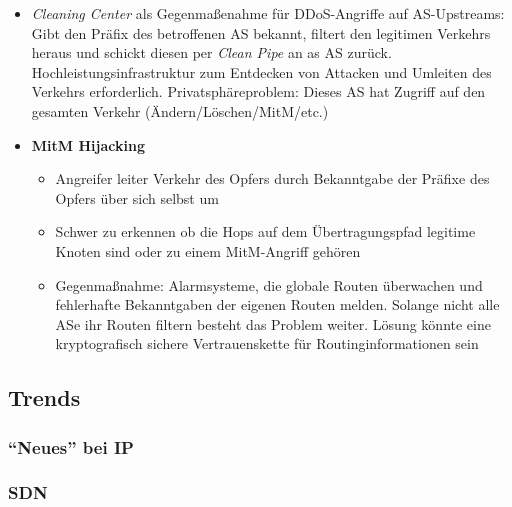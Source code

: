 \begin{itemize}
\begin{itemize}
	\end{itemize}
	\item \textit{Cleaning Center} als Gegenmaßenahme für DDoS-Angriffe auf AS-Upstreams: Gibt den Präfix des betroffenen AS bekannt, filtert den legitimen Verkehrs heraus und schickt diesen per \textit{Clean Pipe} an as AS zurück. Hochleistungsinfrastruktur zum Entdecken von Attacken und Umleiten des Verkehrs erforderlich. Privatsphäreproblem: Dieses AS hat Zugriff auf den gesamten Verkehr (Ändern/Löschen/MitM/etc.)
	\item \textbf{MitM Hijacking}
	\begin{itemize}
		\item Angreifer leiter Verkehr des Opfers durch Bekanntgabe der Präfixe des Opfers über sich selbst um
		\item Schwer zu erkennen ob die Hops auf dem Übertragungspfad legitime Knoten sind oder zu einem MitM-Angriff gehören
		\item Gegenmaßnahme: Alarmsysteme, die globale Routen überwachen und fehlerhafte Bekanntgaben der eigenen Routen melden. Solange nicht alle ASe ihr Routen filtern besteht das Problem weiter. Lösung könnte eine kryptografisch sichere Vertrauenskette für Routinginformationen sein
	\end{itemize}
\end{itemize}


\subsection{Trends}

\subsubsection{"`Neues"' bei IP}

\subsubsection{SDN}
